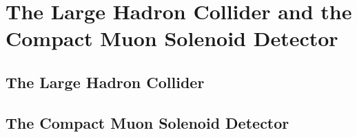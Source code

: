 \chapter{The Large Hadron Collider and the Compact Muon Solenoid Detector}

\section{The Large Hadron Collider} \label{sec:lhc}

\section{The Compact Muon Solenoid Detector} \label{sec:cms}


